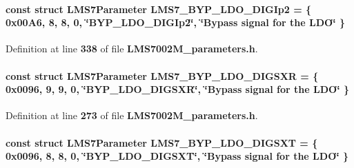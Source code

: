 \paragraph[{L\+M\+S7\+\_\+\+B\+Y\+P\+\_\+\+L\+D\+O\+\_\+\+D\+I\+G\+Ip2}]{\setlength{\rightskip}{0pt plus 5cm}const struct {\bf L\+M\+S7\+Parameter} L\+M\+S7\+\_\+\+B\+Y\+P\+\_\+\+L\+D\+O\+\_\+\+D\+I\+G\+Ip2 = \{ 0x00\+A6, 8, 8, 0, \char`\"{}\+B\+Y\+P\+\_\+\+L\+D\+O\+\_\+\+D\+I\+G\+Ip2\char`\"{}, \char`\"{}\+Bypass signal for the L\+D\+O\char`\"{} \}\hspace{0.3cm}{\ttfamily [static]}}\label{LMS7002M__parameters_8h_abb29dcd940d2241c8020e4b7678a3ad7}


Definition at line {\bf 338} of file {\bf L\+M\+S7002\+M\+\_\+parameters.\+h}.

\paragraph[{L\+M\+S7\+\_\+\+B\+Y\+P\+\_\+\+L\+D\+O\+\_\+\+D\+I\+G\+S\+XR}]{\setlength{\rightskip}{0pt plus 5cm}const struct {\bf L\+M\+S7\+Parameter} L\+M\+S7\+\_\+\+B\+Y\+P\+\_\+\+L\+D\+O\+\_\+\+D\+I\+G\+S\+XR = \{ 0x0096, 9, 9, 0, \char`\"{}\+B\+Y\+P\+\_\+\+L\+D\+O\+\_\+\+D\+I\+G\+S\+X\+R\char`\"{}, \char`\"{}\+Bypass signal for the L\+D\+O\char`\"{} \}\hspace{0.3cm}{\ttfamily [static]}}\label{LMS7002M__parameters_8h_a4d5534eebfce62dc110189bfcde00df3}


Definition at line {\bf 273} of file {\bf L\+M\+S7002\+M\+\_\+parameters.\+h}.

\paragraph[{L\+M\+S7\+\_\+\+B\+Y\+P\+\_\+\+L\+D\+O\+\_\+\+D\+I\+G\+S\+XT}]{\setlength{\rightskip}{0pt plus 5cm}const struct {\bf L\+M\+S7\+Parameter} L\+M\+S7\+\_\+\+B\+Y\+P\+\_\+\+L\+D\+O\+\_\+\+D\+I\+G\+S\+XT = \{ 0x0096, 8, 8, 0, \char`\"{}\+B\+Y\+P\+\_\+\+L\+D\+O\+\_\+\+D\+I\+G\+S\+X\+T\char`\"{}, \char`\"{}\+Bypass signal for the L\+D\+O\char`\"{} \}\hspace{0.3cm}{\ttfamily [static]}}\label{LMS7002M__parameters_8h_af4dbc227a67f235cef423aa48d904b9b}


